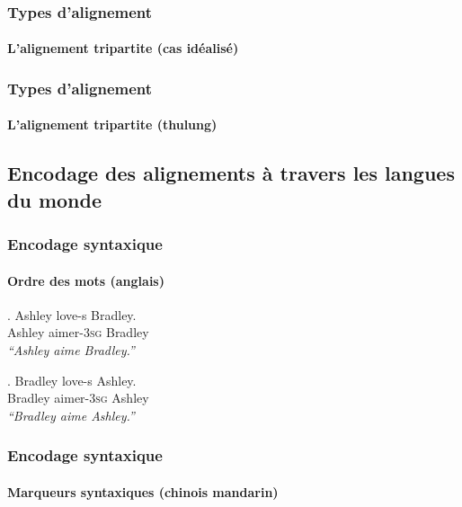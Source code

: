 \begin{frame}
\frametitle{Types d'alignement}
\framesubtitle{L'alignement tripartite (cas idéalisé)}


\end{frame}

\begin{frame}
\frametitle{Types d'alignement}
\framesubtitle{L'alignement tripartite (thulung)}


\end{frame}

\subsection[Encodage des alignements]{Encodage des alignements à travers les langues du monde}

\begin{frame}
\frametitle{Encodage syntaxique}
\framesubtitle{Ordre des mots (anglais)}

\ex. Ashley love-s Bradley.\\
Ashley aimer\textsc{-3sg} Bradley\\
{\em ``Ashley aime Bradley.''}

\ex. Bradley love-s Ashley.\\
Bradley aimer\textsc{-3sg} Ashley\\
{\em ``Bradley aime Ashley.''}

\end{frame}

\begin{frame}
\frametitle{Encodage syntaxique}
\framesubtitle{Marqueurs syntaxiques (chinois mandarin)}




\end{frame}



